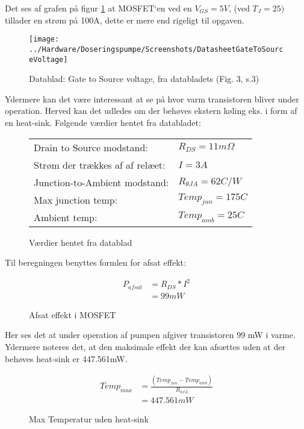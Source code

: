 Det ses af grafen på figur \ref{screenshot:GateToSourceVoltage} at MOSFET`en ved en $ V_{GS} = 5V $, (ved $T_J = 25)$ tillader en strøm på 100A, dette er mere end rigeligt til opgaven.

\begin{figure}[!h]
	\centering
	\texttt{[image: ../Hardware/Doseringspumpe/Screenshots/DatasheetGateToSourceVoltage]}
	\caption{Datablad: Gate to Source voltage, fra databladets (Fig. 3, s.3)}
	\label{screenshot:GateToSourceVoltage}
\end{figure}

Ydermere kan det være interessant at se på hvor varm transistoren bliver under operation. Herved kan det udledes om der behøves ekstern køling eks. i form af en heat-sink.
Følgende værdier hentet fra databladet: 

\begin{figure}[!h]
	\begin{center}
		\begin{tabular}{ l l }
			 Drain to Source modstand:          & $R_{DS}=11 m\Omega$ \\ 
			 Strøm der trækkes af af relæet:    & $I = 3 A$ \\  
			 Junction-to-Ambient modstand:      & $R_{\theta JA}=62 C/W$ \\   
			 Max junction temp:                 & $Temp_{jun}=175 C$ \\
			 Ambient temp:                      & $Temp_{amb}=25 C$ \\
		\end{tabular}
	\end{center}
\caption{Værdier hentet fra datablad}
\end{figure}

Til beregningen benyttes formlen for afsat effekt: 

\begin{figure}[!h]
	\begin{align*}
		P_{afsat} &= R_{DS}*I^2 \\ 
		&= 99 mW
	\end{align*}
\caption{Afsat effekt i MOSFET}
\label{eq:afsatEffektMOSFET}
\end{figure}

Her ses det at under operation af pumpen afgiver transistoren 99 mW i varme. Ydermere noteres det, at den maksimale effekt der kan afsættes uden at der behøves heat-sink er 447.561mW. 

\begin{figure}[!h]
		\begin{align*}
			Temp_{max} &= \frac{(Temp_{jun}-Temp_{amb})}{R_{\theta JA}} \\ 
			&= 447.561 mW
		\end{align*}
\label{eq:maxMOSFETeffekt}
\caption{Max Temperatur uden heat-sink}
\end{figure}

